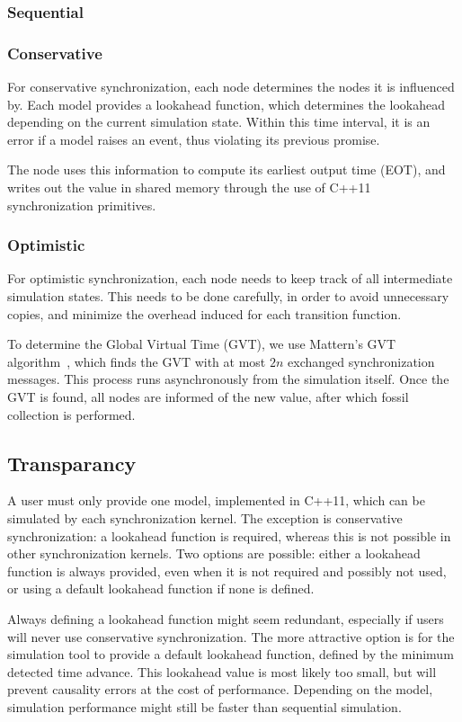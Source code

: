 \subsubsection{Sequential}

\subsubsection{Conservative}
For conservative synchronization, each node determines the nodes it is influenced by.
Each model provides a lookahead function, which determines the lookahead depending on the current simulation state.
Within this time interval, it is an error if a model raises an event, thus violating its previous promise.

The node uses this information to compute its earliest output time (EOT), and writes out the value in shared memory through the use of C++11 synchronization primitives.

\subsubsection{Optimistic}
For optimistic synchronization, each node needs to keep track of all intermediate simulation states.
This needs to be done carefully, in order to avoid unnecessary copies, and minimize the overhead induced for each transition function.

To determine the Global Virtual Time (GVT), we use Mattern's GVT algorithm~\cite{mattern}, which finds the GVT with at most $2n$ exchanged synchronization messages.
This process runs asynchronously from the simulation itself.
Once the GVT is found, all nodes are informed of the new value, after which fossil collection is performed.

\subsection{Transparancy}
A user must only provide one model, implemented in C++11, which can be simulated by each synchronization kernel.
The exception is conservative synchronization: a lookahead function is required, whereas this is not possible in other synchronization kernels.
Two options are possible: either a lookahead function is always provided, even when it is not required and possibly not used, or using a default lookahead function if none is defined.

Always defining a lookahead function might seem redundant, especially if users will never use conservative synchronization.
The more attractive option is for the simulation tool to provide a default lookahead function, defined by the minimum detected time advance.
This lookahead value is most likely too small, but will prevent causality errors at the cost of performance.
Depending on the model, simulation performance might still be faster than sequential simulation.

